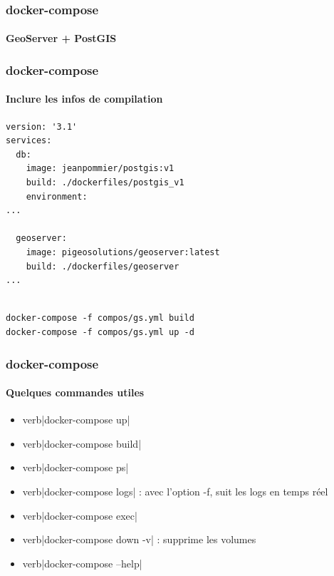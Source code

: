 \documentclass[11pt]{beamer}
\begin{document}
\begin{frame}[fragile]
\frametitle{docker-compose}
\framesubtitle{GeoServer + PostGIS}

\end{frame}

\begin{frame}[fragile]
\frametitle{docker-compose}
\framesubtitle{Inclure les infos de compilation}
\begin{lstlisting}[title=gs.yml]
version: '3.1'
services:
  db:
    image: jeanpommier/postgis:v1
    build: ./dockerfiles/postgis_v1
    environment:
...

  geoserver:
    image: pigeosolutions/geoserver:latest
    build: ./dockerfiles/geoserver
...
    
\end{lstlisting}
\begin{lstlisting}[title=console]
docker-compose -f compos/gs.yml build
docker-compose -f compos/gs.yml up -d
\end{lstlisting}

\end{frame}

\begin{frame}[fragile]
\frametitle{docker-compose}
\framesubtitle{Quelques commandes utiles}
\begin{itemize}
	\item verb|docker-compose up|
	\item verb|docker-compose build|
	\item verb|docker-compose ps|
	\item verb|docker-compose logs| : avec l'option -f, suit les logs en temps réel
	\item verb|docker-compose exec|
	\item verb|docker-compose down -v| : supprime les volumes
	\item verb|docker-compose --help|
\end{itemize}
\end{frame}
\end{document}
